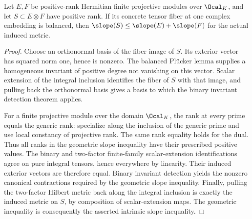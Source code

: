\begin{lemma}
\label{lem:balanced-arithmetic-slope}
\leanok
Let $E,F$ be positive-rank Hermitian finite projective modules over
$\Ocal_K$, and let $S\subset E\otimes F$ have positive rank.
If its concrete tensor fiber at one complex embedding is balanced,
then $\slope(S)\leq\slope(E)+\slope(F)$ for the actual induced metric.
\end{lemma}
\begin{proof}
Choose an orthonormal basis of the fiber image of $S$. Its exterior
vector has squared norm one, hence is nonzero. The balanced Pl\"ucker
lemma supplies a homogeneous invariant of positive degree not vanishing
on this vector. Scalar extension of the integral inclusion identifies
the fiber of $S$ with that image, and pulling back the orthonormal basis
gives a basis to which the binary invariant detection theorem applies.

For a finite projective module over the domain $\Ocal_K$, the rank at
every prime equals the generic rank: specialize along the inclusion
of the generic prime and use local constancy of projective rank.
The same rank equality holds for the dual. Thus all ranks in the
geometric slope inequality have their prescribed positive values.
The binary and two-factor finite-family scalar-extension identifications
agree on pure integral tensors, hence everywhere by linearity.
Their induced exterior vectors are therefore equal. Binary invariant
detection yields the nonzero canonical contractions required by the
geometric slope inequality. Finally, pulling the two-factor Hilbert
metric back along the integral inclusion is exactly the induced metric
on $S$, by composition of scalar-extension maps. The geometric inequality
is consequently the asserted intrinsic slope inequality.
\end{proof}

